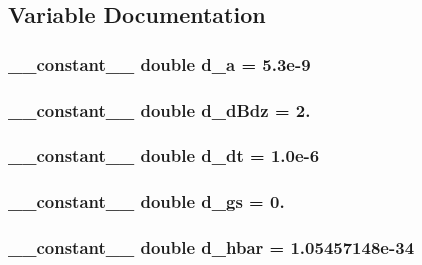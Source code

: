 \subsection{Variable Documentation}
\hypertarget{move_atoms_8cu_a9de002c64acd76b9a5a11c0e3519838c}{
\subsubsection[{d\+\_\+a}]{\setlength{\rightskip}{0pt plus 5cm}\+\_\+\+\_\+constant\+\_\+\+\_\+ double d\+\_\+a = 5.\+3e-\/9}}\label{move_atoms_8cu_a9de002c64acd76b9a5a11c0e3519838c}
\hypertarget{move_atoms_8cu_afa16fa4a33416df0d9677c9cbf1c6619}{
\subsubsection[{d\+\_\+d\+Bdz}]{\setlength{\rightskip}{0pt plus 5cm}\+\_\+\+\_\+constant\+\_\+\+\_\+ double d\+\_\+d\+Bdz = 2.}}\label{move_atoms_8cu_afa16fa4a33416df0d9677c9cbf1c6619}
\hypertarget{move_atoms_8cu_a73197eed5bcda31eef79ed204c0928fe}{
\subsubsection[{d\+\_\+dt}]{\setlength{\rightskip}{0pt plus 5cm}\+\_\+\+\_\+constant\+\_\+\+\_\+ double d\+\_\+dt = 1.\+0e-\/6}}\label{move_atoms_8cu_a73197eed5bcda31eef79ed204c0928fe}
\hypertarget{move_atoms_8cu_ad7fc9ddbbf69cdea9bade997bd3f58f4}{
\subsubsection[{d\+\_\+gs}]{\setlength{\rightskip}{0pt plus 5cm}\+\_\+\+\_\+constant\+\_\+\+\_\+ double d\+\_\+gs = 0.}}\label{move_atoms_8cu_ad7fc9ddbbf69cdea9bade997bd3f58f4}
\hypertarget{move_atoms_8cu_a42ed36be77a88944d259857a94f80eb4}{
\subsubsection[{d\+\_\+hbar}]{\setlength{\rightskip}{0pt plus 5cm}\+\_\+\+\_\+constant\+\_\+\+\_\+ double d\+\_\+hbar = 1.\+05457148e-\/34}}\label{move_atoms_8cu_a42ed36be77a88944d259857a94f80eb4}
